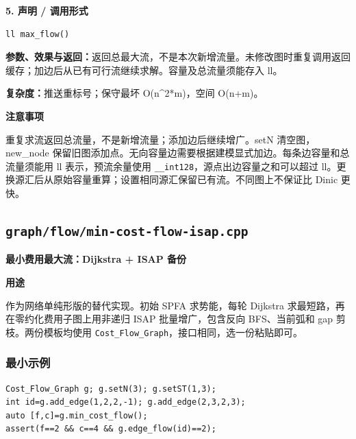 \documentclass[UTF8,a4paper,10pt]{ctexart}
\newcommand{\TemplUsage}[1]{\textbf{用途}\par #1\par}
\newcommand{\TemplNote}[1]{\textbf{注意事项}\par #1\par}
\begin{document}
\noindent\begin{minipage}{\textwidth}
\textbf{5. 声明 / 调用形式}
\begin{lstlisting}
ll max_flow()
\end{lstlisting}
\textbf{参数、效果与返回：}返回总最大流，不是本次新增流量。未修改图时重复调用返回缓存；加边后从已有可行流继续求解。容量及总流量须能存入 ll。

\textbf{复杂度：}推送重标号；保守最坏 O(n\textasciicircum{}2*m)，空间 O(n+m)。

\TemplNote{重复求流返回总流量，不是新增流量；添加边后继续增广。setN 清空图，new\_node 保留旧图添加点。无向容量边需要根据建模显式加边。每条边容量和总流量须能用 ll 表示，预流余量使用 \texttt{\_\_int128}，源点出边容量之和可以超过 ll。更换源汇后从原始容量重算；设置相同源汇保留已有流。不同图上不保证比 Dinic 更快。}
\end{minipage}\par\vspace{0.4em}
\clearpage
\subsection{\texttt{graph/flow/min-cost-flow-isap.cpp}}
\textbf{最小费用最大流：Dijkstra + ISAP 备份}\par
\TemplUsage{作为网络单纯形版的替代实现。初始 SPFA 求势能，每轮 Dijkstra 求最短路，再在零约化费用子图上用非递归 ISAP 批量增广，包含反向 BFS、当前弧和 gap 剪枝。两份模板均使用 \texttt{Cost\_Flow\_Graph}，接口相同，选一份粘贴即可。}
\subsubsection*{最小示例}
\begin{lstlisting}
Cost_Flow_Graph g; g.setN(3); g.setST(1,3);
int id=g.add_edge(1,2,2,-1); g.add_edge(2,3,2,3);
auto [f,c]=g.min_cost_flow();
assert(f==2 && c==4 && g.edge_flow(id)==2);
\end{lstlisting}
\end{document}
